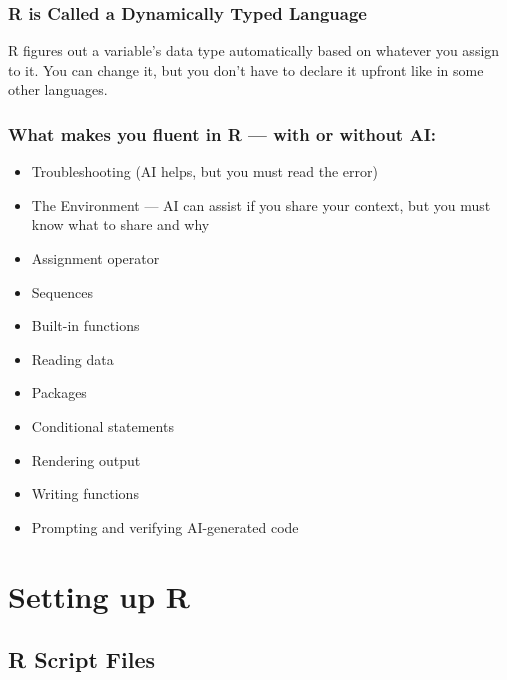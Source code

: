 \documentclass[
  letterpaper,
  DIV=11,
  numbers=noendperiod]{scrreprt}
\providecommand{\tightlist}{%
  \setlength{\itemsep}{0pt}\setlength{\parskip}{0pt}}\usepackage{longtable,booktabs,array}
\begin{document}
\subsection{R is Called a Dynamically Typed
Language}\label{r-is-called-a-dynamically-typed-language}

R figures out a variable's data type automatically based on whatever you
assign to it. You can change it, but you don't have to declare it
upfront like in some other languages.

\subsection{What makes you fluent in R --- with or without
AI:}\label{what-makes-you-fluent-in-r-with-or-without-ai}

\begin{itemize}
\tightlist
\item
  Troubleshooting (AI helps, but you must read the error)
\item
  The Environment --- AI can assist if you share your context, but you
  must know what to share and why
\item
  Assignment operator
\item
  Sequences
\item
  Built-in functions
\item
  Reading data
\item
  Packages
\item
  Conditional statements
\item
  Rendering output
\item
  Writing functions
\item
  Prompting and verifying AI-generated code
\end{itemize}


\chapter{Setting up R}\label{setting-up-r}

\section{R Script Files}\label{r-script-files-1}
\end{document}
